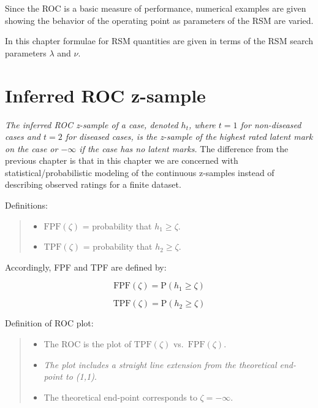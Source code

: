 \documentclass[
]{book}
\providecommand{\tightlist}{%
  \setlength{\itemsep}{0pt}\setlength{\parskip}{0pt}}
\begin{document}
Since the ROC is a basic measure of performance, numerical examples are given showing the behavior of the operating point as parameters of the RSM are varied.

In this chapter formulae for RSM quantities are given in terms of the RSM search parameters \(\lambda\) and \(\nu\).

\hypertarget{rsm-predictions-inferred-roc}{%
\section{Inferred ROC z-sample}\label{rsm-predictions-inferred-roc}}

\emph{The inferred ROC z-sample of a case, denoted \(h_t\), where \(t = 1\) for non-diseased cases and \(t = 2\) for diseased cases, is the z-sample of the highest rated latent mark on the case or \(-\infty\) if the case has no latent marks.} The difference from the previous chapter is that in this chapter we are concerned with statistical/probabilistic modeling of the continuous z-samples instead of describing observed ratings for a finite dataset.

Definitions:

\begin{quote}
\begin{itemize}
\tightlist
\item
  \(\text{FPF}(\zeta)\) = probability that \(h_1 \ge \zeta\).
\item
  \(\text{TPF}(\zeta)\) = probability that \(h_2 \ge \zeta\).
\end{itemize}
\end{quote}

Accordingly, FPF and TPF are defined by:

\begin{equation}
\text{FPF}\left( \zeta \right) = \text{P} \left ( h_1 \geq \zeta\right )
\label{eq:rsm-predictions-fpf-def}
\end{equation}

\begin{equation}
\text{TPF}\left( \zeta \right) = \text{P} \left ( h_2 \geq \zeta\right )
\label{eq:rsm-predictions-tpf-def}
\end{equation}

Definition of ROC plot:

\begin{quote}
\begin{itemize}
\tightlist
\item
  The ROC is the plot of \(\text{TPF}(\zeta)\) vs.~\(\text{FPF}(\zeta)\).
\item
  \emph{The plot includes a straight line extension from the theoretical end-point to (1,1)}.
\item
  The theoretical end-point corresponds to \(\zeta = -\infty\).
\end{itemize}
\end{quote}
\end{document}
